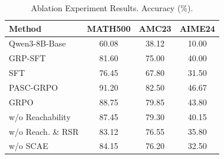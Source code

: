 \begin{table}[htbp]
\centering
\small
\setlength{\tabcolsep}{4pt} %
\caption{Ablation Experiment Results. Accuracy (\%).}
\label{tab:ablation_combined}
\begin{tabular}{lccc} %
\toprule
\textbf{Method} & \textbf{MATH500} & \textbf{AMC23} & \textbf{AIME24} \\
\midrule
Qwen3-8B-Base & 60.08 & 38.12 & 10.00 \\
\midrule
GRP-SFT & 81.60 & 75.00 & 40.00 \\
SFT & 76.45 & 67.80 & 31.50 \\
\midrule
PASC-GRPO & 91.20 & 82.50 & 46.67 \\
GRPO & 88.75 & 79.85 & 43.80 \\
\midrule
w/o Reachability & 87.45 & 79.30 & 40.15 \\
w/o Reach. \& RSR & 83.12 & 76.55 & 35.80 \\
\midrule
w/o SCAE & 84.15 & 76.20 & 32.50 \\
\bottomrule
\end{tabular}
\end{table}
